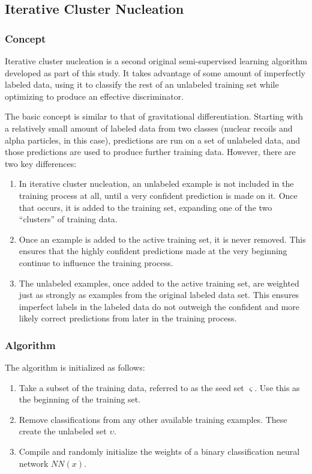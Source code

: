 \documentclass[10pt]{article}
\begin{document}
\subsection{Iterative Cluster Nucleation}

\subsubsection{Concept}

Iterative cluster nucleation is a second original semi-supervised learning algorithm developed as part of this study. It takes advantage of some amount of imperfectly labeled data, using it to classify the rest of an unlabeled training set while optimizing to produce an effective discriminator.

The basic concept is similar to that of gravitational differentiation. Starting with a relatively small amount of labeled data from two classes (nuclear recoils and alpha particles, in this case), predictions are run on a set of unlabeled data, and those predictions are used to produce further training data. However, there are two key differences:

\begin{enumerate}
    \item In iterative cluster nucleation, an unlabeled example is not included in the training process at all, until a very confident prediction is made on it. Once that occurs, it is added to the training set, expanding one of the two ``clusters'' of training data.
    \item Once an example is added to the active training set, it is never removed. This ensures that the highly confident predictions made at the very beginning continue to influence the training process.
    \item The unlabeled examples, once added to the active training set, are weighted just as strongly as examples from the original labeled data set. This ensures imperfect labels in the labeled data do not outweigh the confident and more likely correct predictions from later in the training process.
\end{enumerate}

\subsubsection{Algorithm}

The algorithm is initialized as follows:

\begin{enumerate}
    \item Take a subset of the training data, referred to as the seed set $\varsigma$. Use this as the beginning of the training set.
    \item Remove classifications from any other available training examples. These create the unlabeled set $\upsilon$.
    \item Compile and randomly initialize the weights of a binary classification neural network $NN(x)$.
\end{enumerate}
\end{document}
